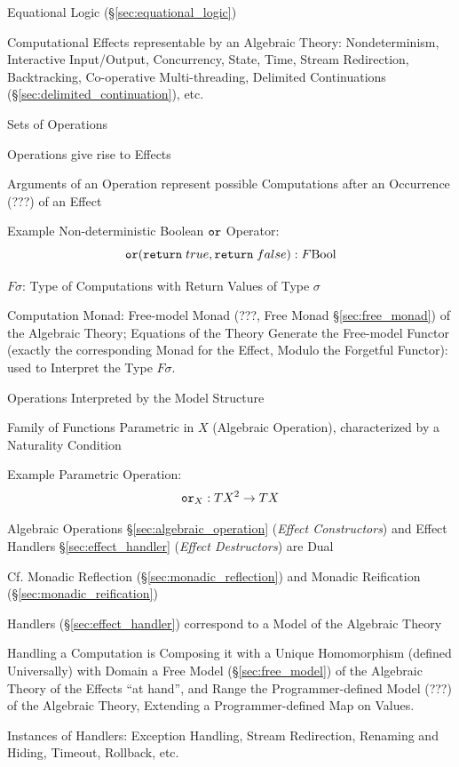 Equational Logic (\S\ref{sec:equational_logic})

Computational Effects representable by an Algebraic Theory:
Nondeterminism, Interactive Input/Output, Concurrency, State, Time,
Stream Redirection, Backtracking, Co-operative Multi-threading,
Delimited Continuations (\S\ref{sec:delimited_continuation}), etc.

Sets of Operations

Operations give rise to Effects

Arguments of an Operation represent possible Computations after an
Occurrence (???) of an Effect

Example Non-deterministic Boolean $\mathtt{or}$ Operator:
\[
  \mathtt{or}(\mathtt{return}\;true, \mathtt{return}\;false)
  : F \mathrm{Bool}
\]

$F \sigma$: Type of Computations with Return Values of Type $\sigma$

Computation Monad: Free-model Monad (???, Free Monad
\S\ref{sec:free_monad}) of the Algebraic Theory; Equations of the
Theory Generate the Free-model Functor (exactly the corresponding
Monad for the Effect, Modulo the Forgetful Functor): used to Interpret
the Type $F \sigma$.

Operations Interpreted by the Model Structure

Family of Functions Parametric in $X$ (Algebraic Operation),
characterized by a Naturality Condition %

Example Parametric Operation:
\[
  \mathtt{or}_X : T X^2 \rightarrow T X
\]

Algebraic Operations \S\ref{sec:algebraic_operation}
(\emph{Effect Constructors}) and Effect Handlers \S\ref{sec:effect_handler}
(\emph{Effect Destructors}) are Dual

\fist Cf. Monadic Reflection (\S\ref{sec:monadic_reflection})
and Monadic Reification (\S\ref{sec:monadic_reification})

Handlers (\S\ref{sec:effect_handler}) correspond to a Model of the
Algebraic Theory

Handling a Computation is Composing it with a Unique Homomorphism
(defined Universally) with Domain a Free Model
(\S\ref{sec:free_model}) of the Algebraic Theory of the Effects ``at
hand'', and Range the Programmer-defined Model (???) of the Algebraic
Theory, Extending a Programmer-defined Map on Values.

Instances of Handlers: Exception Handling, Stream Redirection,
Renaming and Hiding, Timeout, Rollback, etc.


